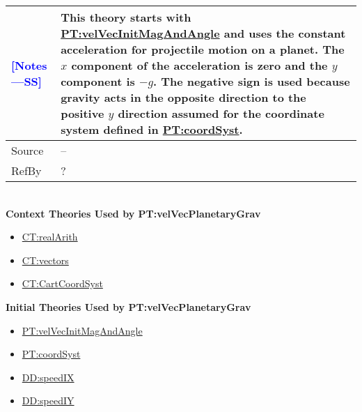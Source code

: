 \documentclass[12pt]{article}
\newcommand{\authornote}[3]{\textcolor{#1}{[#3 ---#2]}}
\newcommand{\authornote}[3]{}
\newcommand{\wss}[1]{\authornote{blue}{SS}{#1}}
\begin{document}
\begin{minipage}{\textwidth}
\begin{tabular}{>{\raggedright}p{}>{\raggedright\arraybackslash}p{}}
\\ \midrule \wss{Notes} & This theory starts with
\hyperref[PT:velVecInitMagAndAngle]{PT:velVecInitMagAndAngle} and uses the
constant acceleration for projectile motion on a planet.  The $x$ component of
the acceleration is zero and the $y$ component is $-g$.  The negative sign is
used because gravity acts in the opposite direction to the positive $y$
direction assumed for the coordinate system defined in
\hyperref[PT:coordSyst]{PT:coordSyst}.

\\ \midrule
Source & --
         
\\ \midrule
RefBy & ?

\\ \bottomrule
\end{tabular}
\end{minipage}
~\\

\noindent \textbf{Context Theories Used by PT:velVecPlanetaryGrav}

\begin{itemize}
\item \hyperref[CT:realArith]{CT:realArith}
\item \hyperref[CT:vectors]{CT:vectors}
\item \hyperref[CT:CartCoordSyst]{CT:CartCoordSyst}
\end{itemize}

\noindent \textbf{Initial Theories Used by PT:velVecPlanetaryGrav}

\begin{itemize}
\item \hyperref[PT:velVecInitMagAndAngle]{PT:velVecInitMagAndAngle}
\item \hyperref[PT:coordSyst]{PT:coordSyst}
\item \hyperref[DD:speedIX]{DD:speedIX}
\item \hyperref[DD:speedIY]{DD:speedIY}
\end{itemize}
\end{document}

